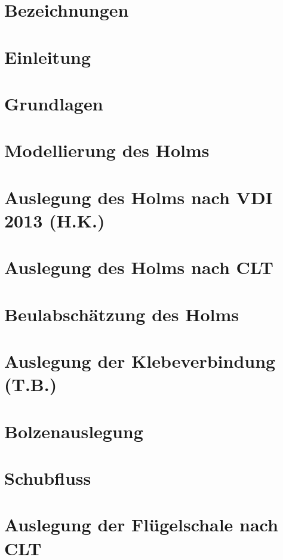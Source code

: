 \documentclass[a4paper,twoside,11pt]{article}
\begin{document}
	

	


\newpage

\newpage
\tableofcontents
\newpage
\section{Bezeichnungen}

\newpage
\section{Einleitung}

\newpage
\section{Grundlagen}

\newpage
\section{Modellierung des Holms}

\newpage
\section{Auslegung des Holms nach VDI 2013 (H.K.)}
\label{VDI2013}

\newpage
\section{Auslegung des Holms nach CLT}

\newpage
\section{Beulabschätzung des Holms}

\newpage
\section{Auslegung der Klebeverbindung (T.B.)}

\newpage
\section{Bolzenauslegung}

\newpage
\section{Schubfluss}

\newpage
\section{Auslegung der Flügelschale nach CLT}

\newpage
\end{document}
